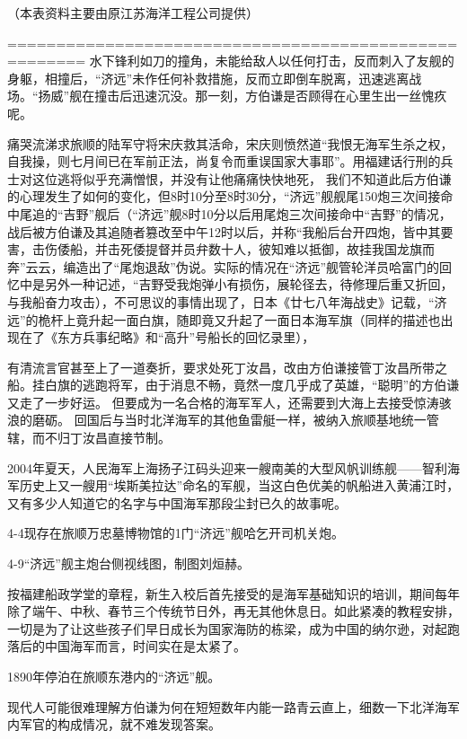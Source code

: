 \documentclass[12pt,UTF8]{ctexbook}
\begin{document}
（本表资料主要由原江苏海洋工程公司提供）

======================================================
水下锋利如刀的撞角，未能给敌人以任何打击，反而刺入了友舰的身躯，相撞后，“济远”未作任何补救措施，反而立即倒车脱离，迅速逃离战场。“扬威”舰在撞击后迅速沉没。那一刻，方伯谦是否顾得在心里生出一丝愧疚呢。

痛哭流涕求旅顺的陆军守将宋庆救其活命，宋庆则愤然道“我恨无海军生杀之权，自我操，则七月间已在军前正法，尚复令而重误国家大事耶”。用福建话行刑的兵士对这位逃将似乎充满憎恨，并没有让他痛痛快快地死，
我们不知道此后方伯谦的心理发生了如何的变化，但8时10分至8时30分，“济远”舰舰尾150炮三次间接命中尾追的“吉野”舰后（“济远”舰8时10分以后用尾炮三次间接命中“吉野”的情况，战后被方伯谦及其追随者篡改至中午12时以后，并称“我船后台开四炮，皆中其要害，击伤倭船，并击死倭提督并员弁数十人，彼知难以抵御，故挂我国龙旗而奔”云云，编造出了“尾炮退敌”伪说。实际的情况在“济远”舰管轮洋员哈富门的回忆中是另外一种记述，“吉野受我炮弹小有损伤，展轮径去，待修理后重又折回，与我船奋力攻击），不可思议的事情出现了，日本《廿七八年海战史》记载，“济远”的桅杆上竟升起一面白旗，随即竟又升起了一面日本海军旗（同样的描述也出现在了《东方兵事纪略》和“高升”号船长的回忆录里），

有清流言官甚至上了一道奏折，要求处死丁汝昌，改由方伯谦接管丁汝昌所带之船。挂白旗的逃跑将军，由于消息不畅，竟然一度几乎成了英雄，“聪明”的方伯谦又走了一步好运。
但要成为一名合格的海军军人，还需要到大海上去接受惊涛骇浪的磨砺。
回国后与当时北洋海军的其他鱼雷艇一样，被纳入旅顺基地统一管辖，而不归丁汝昌直接节制。

2004年夏天，人民海军上海扬子江码头迎来一艘南美的大型风帆训练舰——智利海军历史上又一艘用“埃斯美拉达”命名的军舰，当这白色优美的帆船进入黄浦江时，又有多少人知道它的名字与中国海军那段尘封已久的故事呢。

4-4现存在旅顺万忠墓博物馆的1门“济远”舰哈乞开司机关炮。

4-9“济远”舰主炮台侧视线图，制图刘烜赫。

按福建船政学堂的章程，新生入校后首先接受的是海军基础知识的培训，期间每年除了端午、中秋、春节三个传统节日外，再无其他休息日。如此紧凑的教程安排，一切是为了让这些孩子们早日成长为国家海防的栋梁，成为中国的纳尔逊，对起跑落后的中国海军而言，时间实在是太紧了。

1890年停泊在旅顺东港内的“济远”舰。

现代人可能很难理解方伯谦为何在短短数年内能一路青云直上，细数一下北洋海军内军官的构成情况，就不难发现答案。
\end{document}
